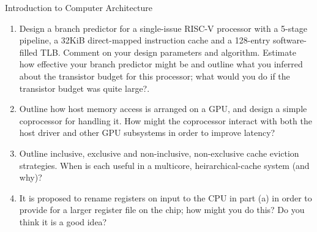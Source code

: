 \documentclass{tripos}
\begin{document}
\begin{question}[MockIA,year=2025,paper=2,question=4,author=nobody]{Introduction to Computer Architecture}

  \begin{enumerate}
  \item Design a branch predictor for a single-issue RISC-V processor
    with a 5-stage pipeline, a 32KiB direct-mapped instruction cache
    and a 128-entry software-filled TLB.  Comment on your design
    parameters and algorithm. Estimate how effective your branch
    predictor might be and outline what you inferred about the
    transistor budget for this processor; what would you do if the
    transistor budget was quite large?.  

  \item Outline how host memory access is arranged on a GPU, and design a simple
    coprocessor for handling it. How might the coprocessor interact with both the
    host driver and other GPU subsystems in order to improve latency?

  \item Outline inclusive, exclusive and non-inclusive, non-exclusive cache eviction strategies.
     When is each useful in a multicore, heirarchical-cache system (and why)?

   \item It is proposed to rename registers on input to the CPU in part (a) in order to provide for a
     larger register file on the chip; how might you do this? Do you think it is a good idea?
  \end{enumerate}
  
 
\end{question}
\eject
\end{document}
